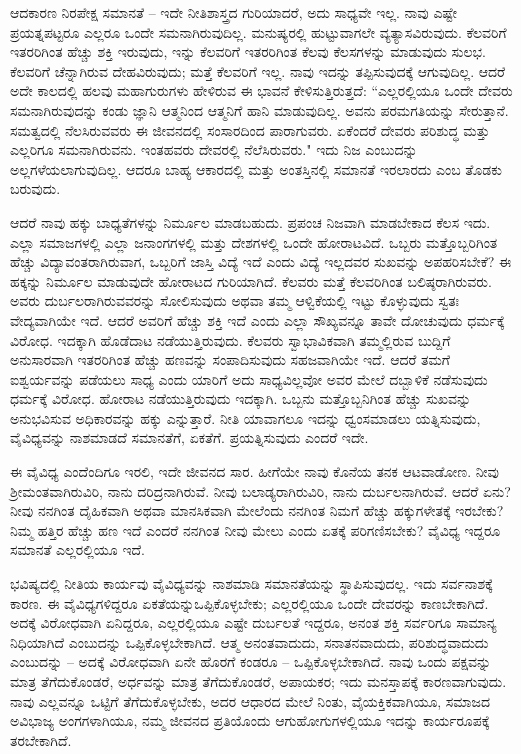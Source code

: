 ಆದಕಾರಣ ನಿರಪೇಕ್ಷ ಸಮಾನತೆ  – ಇದೇ ನೀತಿಶಾಸ್ತ್ರದ ಗುರಿಯಾದರೆ, ಅದು ಸಾಧ್ಯವೇ ಇಲ್ಲ. ನಾವು ಎಷ್ಟೇ ಪ್ರಯತ್ನಪಟ್ಟರೂ ಎಲ್ಲರೂ ಒಂದೇ ಸಮನಾಗಿರುವುದಿಲ್ಲ. ಮನುಷ್ಯರಲ್ಲಿ ಹುಟ್ಟುವಾಗಲೇ ವ್ಯತ್ಯಾಸವಿರುವುದು. ಕೆಲವರಿಗೆ ಇತರರಿಗಿಂತ ಹೆಚ್ಚು ಶಕ್ತಿ ಇರುವುದು, ಇನ್ನು ಕೆಲವರಿಗೆ ಇತರರಿಗಿಂತ ಕೆಲವು ಕೆಲಸಗಳನ್ನು ಮಾಡುವುದು ಸುಲಭ. ಕೆಲವರಿಗೆ ಚೆನ್ನಾಗಿರುವ ದೇಹವಿರುವುದು; ಮತ್ತೆ ಕೆಲವರಿಗೆ ಇಲ್ಲ. ನಾವು ಇದನ್ನು ತಪ್ಪಿಸುವುದಕ್ಕೆ ಆಗುವುದಿಲ್ಲ. ಆದರೆ ಅದೇ ಕಾಲದಲ್ಲಿ ಹಲವು ಮಹಾಗುರುಗಳು ಹೇಳಿರುವ ಈ ಭಾವನೆ ಕೇಳಿಸುತ್ತಿರುತ್ತದೆ: “ಎಲ್ಲರಲ್ಲಿಯೂ ಒಂದೇ ದೇವರು ಸಮನಾಗಿರುವುದನ್ನು ಕಂಡು ಜ್ಞಾನಿ ಆತ್ಮನಿಂದ ಆತ್ಮನಿಗೆ ಹಾನಿ ಮಾಡುವುದಿಲ್ಲ. ಅವನು ಪರಮಗತಿಯನ್ನು ಸೇರುತ್ತಾನೆ. ಸಮತ್ವದಲ್ಲಿ ನೆಲಸಿರುವವರು ಈ ಜೀವನದಲ್ಲಿ ಸಂಸಾರದಿಂದ ಪಾರಾಗುವರು. ಏಕೆಂದರೆ ದೇವರು ಪರಿಶುದ್ಧ ಮತ್ತು ಎಲ್ಲರಿಗೂ ಸಮನಾಗಿರುವನು. ಇಂತಹವರು ದೇವರಲ್ಲಿ ನೆಲೆಸಿರುವರು." ಇದು ನಿಜ ಎಂಬುದನ್ನು ಅಲ್ಲಗಳೆಯಲಾಗುವುದಿಲ್ಲ. ಆದರೂ ಬಾಹ್ಯ ಆಕಾರದಲ್ಲಿ ಮತ್ತು ಅಂತಸ್ತಿನಲ್ಲಿ ಸಮಾನತೆ ಇರಲಾರದು ಎಂಬ ತೊಡಕು ಬರುವುದು.

ಆದರೆ ನಾವು ಹಕ್ಕು ಬಾಧ್ಯತೆಗಳನ್ನು ನಿರ್ಮೂಲ ಮಾಡಬಹುದು. ಪ್ರಪಂಚ ನಿಜವಾಗಿ ಮಾಡಬೇಕಾದ ಕೆಲಸ ಇದು. ಎಲ್ಲಾ ಸಮಾಜಗಳಲ್ಲಿ ಎಲ್ಲಾ ಜನಾಂಗಗಳಲ್ಲಿ ಮತ್ತು ದೇಶಗಳಲ್ಲಿ ಒಂದೇ ಹೋರಾಟವಿದೆ. ಒಬ್ಬರು ಮತ್ತೊಬ್ಬರಿಗಿಂತ ಹೆಚ್ಚು ವಿದ್ಯಾವಂತರಾಗಿರುವಾಗ, ಒಬ್ಬರಿಗೆ ಜಾಸ್ತಿ ವಿದ್ಯೆ ಇದೆ ಎಂದು ವಿದ್ಯೆ ಇಲ್ಲದವರ ಸುಖವನ್ನು ಅಪಹರಿಸಬೇಕೆ? ಈ ಹಕ್ಕನ್ನು ನಿರ್ಮೂಲ ಮಾಡುವುದೇ ಹೋರಾಟದ ಗುರಿಯಾಗಿದೆ. ಕೆಲವರು ಮತ್ತೆ ಕೆಲವರಿಗಿಂತ ಬಲಿಷ್ಠರಾಗಿರುವರು. ಅವರು ದುರ್ಬಲರಾಗಿರುವವರನ್ನು ಸೋಲಿಸುವುದು ಅಥವಾ ತಮ್ಮ ಆಳ್ವಿಕೆಯಲ್ಲಿ ಇಟ್ಟು ಕೊಳ್ಳುವುದು ಸ್ವತಃ ವೇದ್ಯವಾಗಿಯೇ ಇದೆ. ಆದರೆ ಅವರಿಗೆ ಹೆಚ್ಚು ಶಕ್ತಿ ಇದೆ ಎಂದು ಎಲ್ಲಾ ಸೌಖ್ಯವನ್ನೂ ತಾವೇ ದೋಚುವುದು ಧರ್ಮಕ್ಕೆ ವಿರೋಧ. ಇದಕ್ಕಾಗಿ ಹೊಡೆದಾಟ ನಡೆಯುತ್ತಿರುವುದು. ಕೆಲವರು ಸ್ವಾಭಾವಿಕವಾಗಿ ತಮ್ಮಲ್ಲಿರುವ ಬುದ್ದಿಗೆ ಅನುಸಾರವಾಗಿ ಇತರರಿಗಿಂತ ಹೆಚ್ಚು ಹಣವನ್ನು ಸಂಪಾದಿಸುವುದು ಸಹಜವಾಗಿಯೇ ಇದೆ. ಆದರೆ ತಮಗೆ ಐಶ್ವರ್ಯವನ್ನು ಪಡೆಯಲು ಸಾಧ್ಯ ಎಂದು ಯಾರಿಗೆ ಅದು ಸಾಧ್ಯವಿಲ್ಲವೋ ಅವರ ಮೇಲೆ ದಬ್ಬಾಳಿಕೆ ನಡೆಸುವುದು ಧರ್ಮಕ್ಕೆ ವಿರೋಧ. ಹೋರಾಟ ನಡೆಯುತ್ತಿರುವುದು ಇದಕ್ಕಾಗಿ. ಒಬ್ಬನು ಮತ್ತೊಬ್ಬನಿಗಿಂತ ಹೆಚ್ಚು ಸುಖವನ್ನು ಅನುಭವಿಸುವ ಅಧಿಕಾರವನ್ನು ಹಕ್ಕು ಎನ್ನುತ್ತಾರೆ. ನೀತಿ ಯಾವಾಗಲೂ ಇದನ್ನು ಧ್ವಂಸಮಾಡಲು ಯತ್ನಿಸುವುದು, ವೈವಿಧ್ಯವನ್ನು ನಾಶಮಾಡದೆ ಸಮಾನತೆಗೆ, ಏಕತೆಗೆ. ಪ್ರಯತ್ನಿಸುವುದು ಎಂದರೆ ಇದೇ.

ಈ ವೈವಿಧ್ಯ ಎಂದೆಂದಿಗೂ ಇರಲಿ, ಇದೇ ಜೀವನದ ಸಾರ. ಹೀಗೆಯೇ ನಾವು ಕೊನೆಯ ತನಕ ಆಟವಾಡೋಣ. ನೀವು ಶ‍್ರೀಮಂತವಾಗಿರುವಿರಿ, ನಾನು ದರಿದ್ರನಾಗಿರುವೆ. ನೀವು ಬಲಾಡ್ಯರಾಗಿರುವಿರಿ, ನಾನು ದುರ್ಬಲನಾಗಿರುವೆ. ಆದರೆ ಏನು? ನೀವು ನನಗಿಂತ ದೈಹಿಕವಾಗಿ ಅಥವಾ ಮಾನಸಿಕವಾಗಿ ಮೇಲೆಂದು ನನಗಿಂತ ನಿಮಗೆ ಹೆಚ್ಚು ಹಕ್ಕುಗಳೇತಕ್ಕೆ ಇರಬೇಕು? ನಿಮ್ಮ ಹತ್ತಿರ ಹೆಚ್ಚು ಹಣ ಇದೆ ಎಂದರೆ ನನಗಿಂತ ನೀವು ಮೇಲು ಎಂದು ಏತಕ್ಕೆ ಪರಿಗಣಿಸಬೇಕು? ವೈವಿಧ್ಯ ಇದ್ದರೂ ಸಮಾನತೆ ಎಲ್ಲರಲ್ಲಿಯೂ ಇದೆ.

ಭವಿಷ್ಯದಲ್ಲಿ ನೀತಿಯ ಕಾರ್ಯವು ವೈವಿಧ್ಯವನ್ನು ನಾಶಮಾಡಿ ಸಮಾನತೆಯನ್ನು ಸ್ಥಾಪಿಸುವುದಲ್ಲ. ಇದು ಸರ್ವನಾಶಕ್ಕೆ ಕಾರಣ. ಈ ವೈವಿಧ್ಯಗಳಿದ್ದರೂ ಏಕತೆಯನ್ನು\break ಒಪ್ಪಿಕೊಳ್ಳಬೇಕು; ಎಲ್ಲರಲ್ಲಿಯೂ ಒಂದೇ ದೇವರನ್ನು ಕಾಣಬೇಕಾಗಿದೆ. ಅದಕ್ಕೆ ವಿರೋಧವಾಗಿ ಏನಿದ್ದರೂ, ಎಲ್ಲರಲ್ಲಿಯೂ ಎಷ್ಟೇ ದುರ್ಬಲತೆ ಇದ್ದರೂ, ಅನಂತ ಶಕ್ತಿ ಸರ್ವರಿಗೂ ಸಾಮಾನ್ಯ ನಿಧಿಯಾಗಿದೆ ಎಂಬುದನ್ನು ಒಪ್ಪಿಕೊಳ್ಳಬೇಕಾಗಿದೆ. ಆತ್ಮ ಅನಂತವಾದುದು, ಸನಾತನವಾದುದು, ಪರಿಶುದ್ಧವಾದುದು ಎಂಬುದನ್ನು – ಅದಕ್ಕೆ ವಿರೋಧವಾಗಿ ಏನೇ ಹೊರಗೆ ಕಂಡರೂ – ಒಪ್ಪಿಕೊಳ್ಳಬೇಕಾಗಿದೆ. ನಾವು ಒಂದು ಪಕ್ಷವನ್ನು ಮಾತ್ರ ತೆಗೆದುಕೊಂಡರೆ, ಅರ್ಧವನ್ನು ಮಾತ್ರ ತೆಗೆದುಕೊಂಡರೆ, ಅಪಾಯಕರ; ಇದು ಮನಸ್ತಾಪಕ್ಕೆ ಕಾರಣವಾಗುವುದು. ನಾವು ಎಲ್ಲವನ್ನೂ ಒಟ್ಟಿಗೆ ತೆಗೆದುಕೊಳ್ಳಬೇಕು, ಅದರ ಆಧಾರದ ಮೇಲೆ ನಿಂತು, ವೈಯಕ್ತಿಕವಾಗಿಯೂ, ಸಮಾಜದ ಅವಿಭಾಜ್ಯ ಅಂಗಗಳಾಗಿಯೂ, ನಮ್ಮ ಜೀವನದ ಪ್ರತಿಯೊಂದು ಆಗುಹೋಗುಗಳಲ್ಲಿಯೂ ಇದನ್ನು ಕಾರ್ಯರೂಪಕ್ಕೆ ತರಬೇಕಾಗಿದೆ.

